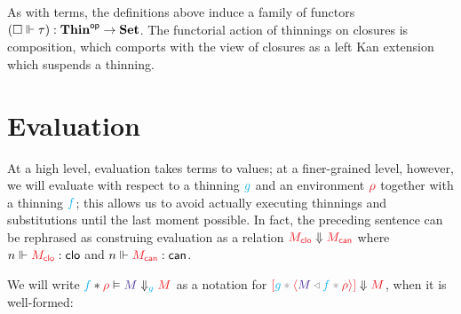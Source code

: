 \documentclass{article}
\DeclarePairedDelimiter\Parens{\lparen}{\rparen}
\newcommand\FmtThin[1]{{\color{ProcessBlue}#1}}
\newcommand\THIN{\mathbf{Thin}}
\newcommand\OpCat[1]{{#1}^{\mathsf{op}}}
\newcommand\SET{\mathbf{Set}}
\newcommand\FmtTm[1]{{\color{Violet}#1}}
\newcommand\FmtVal[1]{{\color{Red}{#1}}}
\begin{document}
As with terms, the definitions above induce a family of functors
$\Parens*{\Val{\square}{\tau}}:\OpCat{\THIN}\to\SET$. The functorial
action of thinnings on closures is composition, which comports with
the view of closures as a left Kan extension which suspends a
thinning.


\section{Evaluation}
\newcommand\EvalClo[2]{\FmtVal{#1}\Downarrow\FmtVal{#2}}
\newcommand\Eval[5]{\FmtThin{#2}*\FmtVal{#3}\vDash\FmtTm{#4}\mathrel{\Downarrow_{\FmtThin{#1}}}\FmtVal{#5}}
\newcommand\Apply[3]{\FmtVal{#1}\mathrel{@}\FmtVal{#2}\Downarrow\FmtVal{#3}}
\newcommand\InstClo[3]{\FmtVal{#1}\bullet\FmtVal{#2}\Downarrow\FmtVal{#3}}
\newcommand\ThinVal[2]{\widehat{\FmtThin{#1}}\Parens*{\FmtVal{#2}}}

At a high level, evaluation takes terms to values; at a finer-grained
level, however, we will evaluate with respect to a thinning
$\FmtThin{g}$ and an environment $\FmtVal{\rho}$ together with a
thinning $\FmtThin{f}$; this allows us to avoid actually executing
thinnings and substitutions until the last moment possible. In fact,
the preceding sentence can be rephrased as construing evaluation as a
relation $\EvalClo{M_\SortClo}{M_\SortCan}$ where
$\IsVal{n}{M_\SortClo}{\SortClo}$ and
$\IsVal{n}{M_\SortCan}{\SortCan}$.

We will write $\Eval{g}{f}{\rho}{M}{M}$ as a notation for
$\EvalClo{\Clo{g}{f}{\rho}{M}}{M}$, when it is well-formed:
\end{document}
